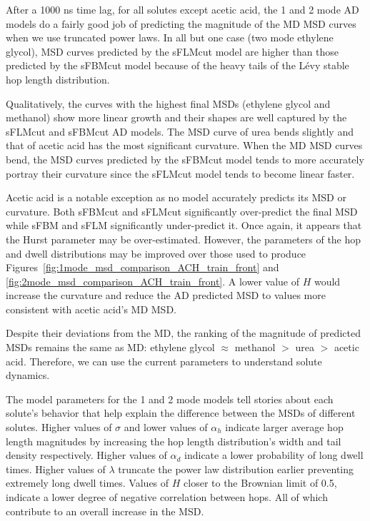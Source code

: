 \documentclass{article}
\begin{document}
  After a 1000 ns time lag, for all solutes except acetic acid, the 1 and 2 mode 
  AD models do a fairly good job of predicting the magnitude of the MD 
  MSD curves when we use truncated power laws. In all but one case (two mode 
  ethylene glycol), MSD curves predicted by the sFLMcut model are higher than 
  those predicted by the sFBMcut model because of the heavy tails of the L\'evy 
  stable hop length distribution. 
  
  Qualitatively, the curves with the highest final MSDs (ethylene glycol and 
  methanol) show more linear growth and their shapes are well captured by the
  sFLMcut and sFBMcut AD models. The MSD curve of urea bends slightly and 
  that of acetic acid has the most significant curvature. When the MD MSD 
  curves bend, the MSD curves predicted by the sFBMcut model tends to more 
  accurately portray their curvature since the sFLMcut model tends to become 
  linear faster.
  
  Acetic acid is a notable exception as no model accurately predicts its
  MSD or curvature. Both sFBMcut and sFLMcut significantly over-predict the final
  MSD while sFBM and sFLM significantly under-predict it. Once again, it 
  appears that the Hurst parameter may be over-estimated. However, the parameters
  of the hop and dwell distributions may be improved over those used to produce
  Figures~\ref{fig:1mode_msd_comparison_ACH_train_front} and
  \ref{fig:2mode_msd_comparison_ACH_train_front}. A lower value of $H$ would 
  increase the curvature and reduce the AD predicted MSD to values more consistent
  with acetic acid's MD MSD.
  
  Despite their deviations from the MD, the ranking of the magnitude of predicted
  MSDs remains the same as MD: ethylene glycol $\approx$ methanol $>$ urea $>$ acetic acid.
  Therefore, we can use the current parameters to understand solute dynamics.
  
  The model parameters for the 1 and 2 mode models tell stories about each solute's
  behavior that help explain the difference between the MSDs of different solutes. 
  Higher values of $\sigma$ and lower values of $\alpha_h$ indicate larger average 
  hop length magnitudes by increasing the hop length distribution's width and tail 
  density respectively. Higher values of $\alpha_d$ indicate a lower probability of 
  long dwell times. Higher values of $\lambda$ truncate the power law distribution 
  earlier preventing extremely long dwell times. Values of $H$ closer to the Brownian
  limit of 0.5, indicate a lower degree of negative correlation between hops. All 
  of which contribute to an overall increase in the MSD.
  
\end{document}
